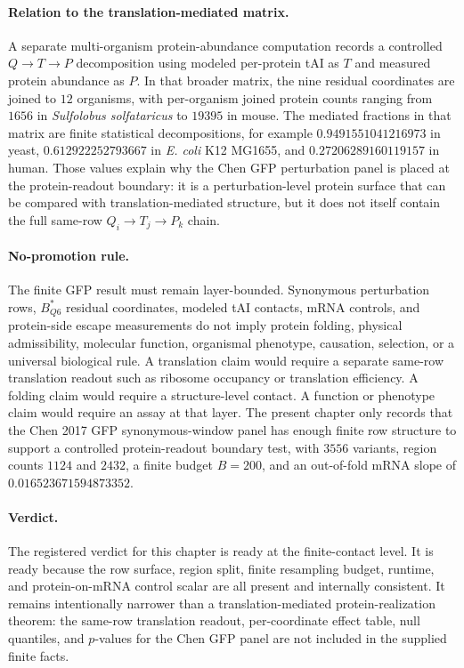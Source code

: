 \paragraph{Relation to the translation-mediated matrix.}
A separate multi-organism protein-abundance computation records a controlled $Q \to T \to P$ decomposition using modeled per-protein tAI as $T$ and measured protein abundance as $P$.  In that broader matrix, the nine residual coordinates are joined to $12$ organisms, with per-organism joined protein counts ranging from $1656$ in \textit{Sulfolobus solfataricus} to $19395$ in mouse.  The mediated fractions in that matrix are finite statistical decompositions, for example $0.9491551041216973$ in yeast, $0.612922252793667$ in \textit{E. coli} K12 MG1655, and $0.27206289160119157$ in human.  Those values explain why the Chen GFP perturbation panel is placed at the protein-readout boundary: it is a perturbation-level protein surface that can be compared with translation-mediated structure, but it does not itself contain the full same-row $Q_i \to T_j \to P_k$ chain.

\paragraph{No-promotion rule.}
The finite GFP result must remain layer-bounded.  Synonymous perturbation rows, $B^{\ast}_{Q6}$ residual coordinates, modeled tAI contacts, mRNA controls, and protein-side escape measurements do not imply protein folding, physical admissibility, molecular function, organismal phenotype, causation, selection, or a universal biological rule.  A translation claim would require a separate same-row translation readout such as ribosome occupancy or translation efficiency.  A folding claim would require a structure-level contact.  A function or phenotype claim would require an assay at that layer.  The present chapter only records that the Chen 2017 GFP synonymous-window panel has enough finite row structure to support a controlled protein-readout boundary test, with $3556$ variants, region counts $1124$ and $2432$, a finite budget $B=200$, and an out-of-fold mRNA slope of $0.016523671594873352$.

\paragraph{Verdict.}
The registered verdict for this chapter is ready at the finite-contact level.  It is ready because the row surface, region split, finite resampling budget, runtime, and protein-on-mRNA control scalar are all present and internally consistent.  It remains intentionally narrower than a translation-mediated protein-realization theorem: the same-row translation readout, per-coordinate effect table, null quantiles, and $p$-values for the Chen GFP panel are not included in the supplied finite facts.